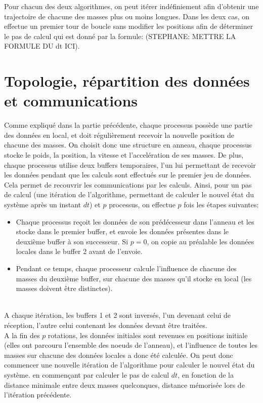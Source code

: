 \documentclass[a4paper,11pt]{article}
\begin{document}
Pour chacun des deux algorithmes, on peut itérer indéfiniement afin d'obtenir une trajectoire de chacune des masses plus ou moins longues. Dans les deux cas, on effectue un premier tour de boucle sans modifier les positions afin de déterminer le pas de calcul qui est donné par la formule: (STEPHANE: METTRE LA FORMULE DU dt ICI).





\section{Topologie, répartition des données et communications}
Comme expliqué dans la partie précédente, chaque processus possède une partie des données en local, et doit régulièrement recevoir la nouvelle position de chacune des masses. On choisit donc une structure en anneau, chaque processus stocke le poids, la position, la vitesse et l'accelération de ses masses. De plus, chaque processus utilise deux buffers temporaires, l'un lui permettant de recevoir les données pendant que les calculs sont effectués sur le premier jeu de données. Cela permet de recouvrir les communications par les calculs. Ainsi, pour un pas de calcul (une itération de l'algorithme, permettant de calculer le nouvel état du système après un instant $dt$) et $p$ processus, on effectue $p$ fois les étapes suivantes:\\
\begin{itemize}
\item Chaque processus reçoit les données de son prédécesseur dans l'anneau et les stocke dans le premier buffer, et envoie les données présentes dans le deuxième buffer à son successeur. Si $p = 0$, on copie au préalable les données locales dans le buffer 2 avant de l'envoie.
\item Pendant ce temps, chaque processeur calcule l'influence de chacune des masses du deuxième buffer, sur chacune des masses qu'il stocke en local (les masses doivent être distinctes).
\end{itemize}\\
 A chaque itération, les buffers 1 et 2 sont inversés, l'un devenant celui de réception, l'autre celui contenant les données devant être traitées.\\
 
 A la fin des $p$ rotations, les données initiales sont revenues en positions initiale (elles ont parcouru l'ensemble des noeuds de l'anneau), et l'influence de toutes les masses sur chacune des données locales a donc été calculée.
 On peut donc commencer une nouvelle itération de l'algorithme pour calculer le nouvel état du système. en commençant par calculer le pas de calcul $dt$, en fonction de la distance minimale entre deux masses quelconques, distance mémorisée lors de l'itération précédente.
 
\end{document}
